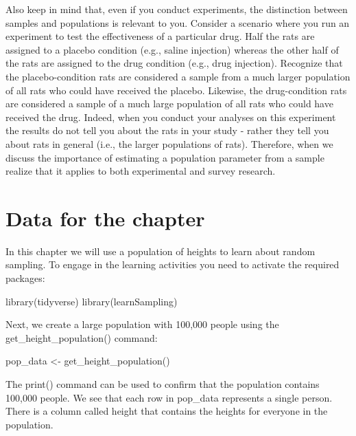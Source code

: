\documentclass[
]{krantz}
\makeatletter
\newenvironment{Shaded}{\begin{snugshade}}{\end{snugshade}}
\newcommand{\FunctionTok}[1]{\textcolor[rgb]{0,0,0}{#1}}
\newcommand{\NormalTok}[1]{#1}
\newcommand{\OtherTok}[1]{\textcolor[rgb]{0.37,0.37,0.37}{#1}}
\newenvironment{kframe}{%
\medskip{}
\setlength{\fboxsep}{.8em}
 \def\at@end@of@kframe{}%
 \ifinner\ifhmode%
  \def\at@end@of@kframe{\end{minipage}}%
  \begin{minipage}{\columnwidth}%
 \fi\fi%
 \def\FrameCommand##1{\hskip\@totalleftmargin \hskip-\fboxsep
 \colorbox{shadecolor}{##1}\hskip-\fboxsep
     \hskip-\linewidth \hskip-\@totalleftmargin \hskip\columnwidth}%
 \MakeFramed {\advance\hsize-\width
   \@totalleftmargin\z@ \linewidth\hsize
   \@setminipage}}%
 {\par\unskip\endMakeFramed%
 \at@end@of@kframe}
\renewenvironment{Shaded}{\begin{kframe}}{\end{kframe}}
\makeatother
\begin{document}
Also keep in mind that, even if you conduct experiments, the distinction between samples and populations is relevant to you. Consider a scenario where you run an experiment to test the effectiveness of a particular drug. Half the rats are assigned to a placebo condition (e.g., saline injection) whereas the other half of the rats are assigned to the drug condition (e.g., drug injection). Recognize that the placebo-condition rats are considered a sample from a much larger population of all rats who could have received the placebo. Likewise, the drug-condition rats are considered a sample of a much large population of all rats who could have received the drug. Indeed, when you conduct your analyses on this experiment the results do not tell you about the rats in your study - rather they tell you about rats in general (i.e., the larger populations of rats). Therefore, when we discuss the importance of estimating a population parameter from a sample realize that it applies to both experimental and survey research.

\hypertarget{data-for-the-chapter}{%
\section{Data for the chapter}\label{data-for-the-chapter}}

In this chapter we will use a population of heights to learn about random sampling. To engage in the learning activities you need to activate the required packages:

\begin{Shaded}
\begin{Highlighting}[]
\FunctionTok{library}\NormalTok{(tidyverse)}
\FunctionTok{library}\NormalTok{(learnSampling)}
\end{Highlighting}
\end{Shaded}

Next, we create a large population with 100,000 people using the get\_height\_population() command:

\begin{Shaded}
\begin{Highlighting}[]
\NormalTok{pop\_data }\OtherTok{\textless{}{-}} \FunctionTok{get\_height\_population}\NormalTok{() }
\end{Highlighting}
\end{Shaded}

The print() command can be used to confirm that the population contains 100,000 people. We see that each row in pop\_data represents a single person. There is a column called height that contains the heights for everyone in the population.
\end{document}
